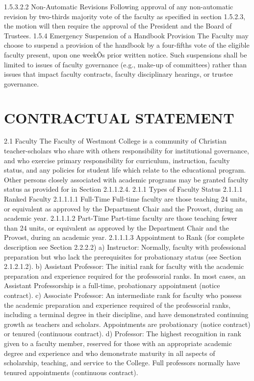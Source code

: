 \documentclass[letterpaper, 11pt]{article}
\begin{document}
1.5.3.2.2 Non-Automatic Revisions
Following approval of any non-automatic revision by two-thirds majority vote of the faculty as specified in section 1.5.2.3, the motion will then require the approval of the President and the Board of Trustees.
1.5.4 Emergency Suspension of a Handbook Provision
   The Faculty may choose to suspend a provision of the handbook by a four-fifths vote of the eligible faculty present, upon one weekÕs prior written notice.  Such suspensions shall be limited to issues of faculty governance (e.g., make-up of committees) rather than issues that impact faculty contracts, faculty disciplinary hearings, or trustee governance.
   
\section{CONTRACTUAL STATEMENT}
\label{sec:ContractualStatement}
2.1 Faculty
   The Faculty of Westmont College is a community of Christian teacher-scholars who share with others responsibility for institutional governance, and who exercise primary responsibility for curriculum, instruction, faculty status, and any policies for student life which relate to the educational program.  Other persons closely associated with academic programs may be granted faculty status as provided for in Section 2.1.1.2.4.
2.1.1 Types of Faculty Status
2.1.1.1 Ranked Faculty
2.1.1.1.1 Full-Time
   Full-time faculty are those teaching 24 units, or equivalent as approved by the Department Chair and the Provost, during an academic year.
2.1.1.1.2 Part-Time
   Part-time faculty are those teaching fewer than 24 units, or equivalent as approved by the Department Chair and the Provost, during an academic year.
2.1.1.1.3 Appointment to Rank
	(for complete description see Section 2.2.2.2)
a) Instructor:  Normally, faculty with professional preparation but who lack the prerequisites for probationary status (see Section 2.1.2.1.2).
b) Assistant Professor:  The initial rank for faculty with the academic preparation and experience required for the professorial ranks. In most cases, an Assistant Professorship is a full-time, probationary appointment (notice contract).
c) Associate Professor:  An intermediate rank for faculty who possess the academic preparation and experience required of the professorial ranks, including a terminal degree in their discipline, and have demonstrated continuing growth as teachers and scholars. Appointments are probationary (notice contract) or tenured (continuous contract).
d) Professor:  The highest recognition in rank given to a faculty member, reserved for those with an appropriate academic degree and experience and who demonstrate maturity in all aspects of scholarship, teaching, and service to the College. Full professors normally have tenured appointments (continuous contract).
\end{document}

